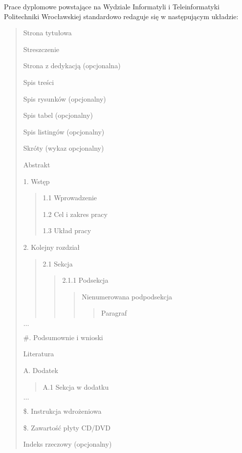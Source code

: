 Prace dyplomowe powstające na Wydziale Informatyli i Teleinformatyki Politechniki Wrocławskiej standardowo redaguje się w następującym układzie:
\begin{quote}
\item Strona tytułowa
\item Streszczenie 
\item Strona z dedykacją (opcjonalna)
\item Spis treści  
\item Spis rysunków (opcjonalny)
\item Spis tabel (opcjonalny)
\item Spis listingów (opcjonalny)
\item Skróty (wykaz opcjonalny)
\item Abstrakt 
\item 1. Wstęp 
\begin{quote}
\item 1.1 Wprowadzenie 
\item 1.2 Cel i zakres pracy 
\item 1.3 Układ pracy 
\end{quote}
\item 2. Kolejny rozdział
\begin{quote}
\item 2.1 Sekcja
\begin{quote}
\item 2.1.1 Podsekcja
\begin{quote}
\item Nienumerowana podpodsekcja
\begin{quote}
\item Paragraf
\end{quote}
\end{quote}
\end{quote}
\end{quote}
\item $\ldots$
\item \#. Podsumownie i wnioski
\item Literatura
\item A. Dodatek
\begin{quote}
\item A.1 Sekcja w dodatku
\end{quote}
\item $\ldots$
\item \$. Instrukcja wdrożeniowa
\item \$. Zawartość płyty CD/DVD
\item Indeks rzeczowy (opcjonalny)
\end{quote}\vspace{5mm}



